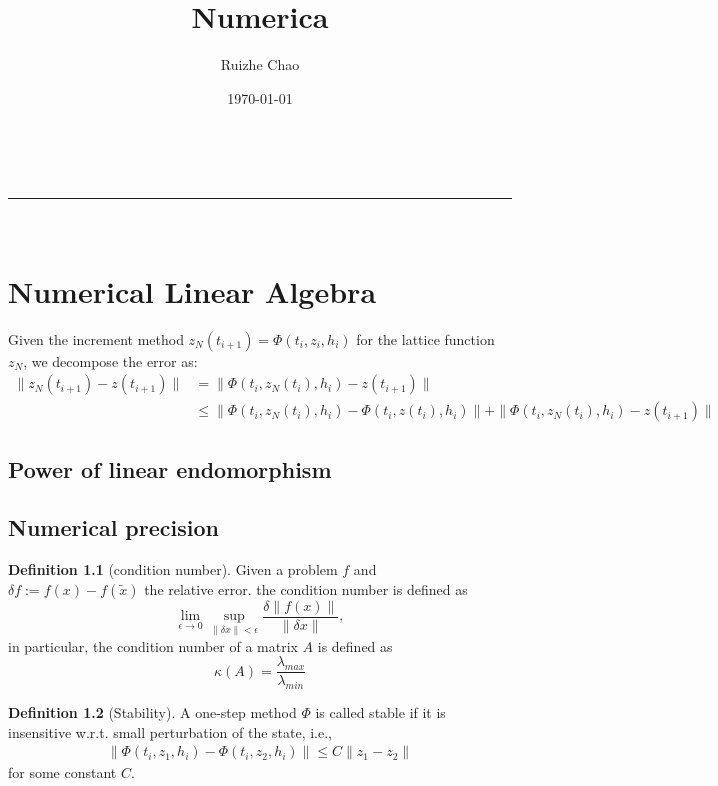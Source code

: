 \documentclass[a4paper,12pt,oneside,fleqn]{book}
\makeatletter
\theoremstyle{definition}
\newtheorem{definition}{Definition}[section]
\theoremstyle{remark}
\newcommand{\linia}{\rule{\linewidth}{0.5pt}}
\renewcommand{\maketitle}{
\begin{center}
\vspace{2ex}
{\huge \textsc{\@title}}
\vspace{1ex}
\\
\linia\\
\@author \hfill \@date
\vspace{4ex}
\end{center}
}
\makeatother
\begin{document}
\title{Numerica}
\author{Ruizhe Chao}
\date{\today}
\maketitle
\tableofcontents



\chapter{Numerical Linear Algebra}
Given the increment method $ z_N(t_{i + 1}) = \Phi(t_i, z_i, h_i)$  for the lattice function $z_N$, we decompose the error as:
\begin{align*}
	\|z_N(t_{i + 1}) - z(t_{i + 1})\| &= \|\Phi(t_i, z_N(t_i), h_i) - z(t_{i + 1})\|\\
	&\le \| \Phi(t_i, z_N(t_i), h_i) - \Phi(t_i, z(t_i), h_i)\|
	 + \|\Phi(t_i, z_N(t_i), h_i)  - z(t_{i + 1})\|
\end{align*}


\section{Power of linear endomorphism}


\section{Numerical precision}
\begin{definition}[condition number]
Given a problem $f$ and $\delta f:= f(x) - f(\tilde{x})$ the relative error. the condition number is defined as 
\begin{equation}
	\lim_{\epsilon \rightarrow 0} \sup_{\|\delta x\|< \epsilon} \frac{\delta\|f(x)\|}{\|\delta x\|},
\end{equation}
in particular, the condition number of a matrix $A$ is defined as
\begin{equation}
	\kappa(A) = \frac{\lambda_{max}}{\lambda_{min}}
\end{equation}
\end{definition}

\begin{definition}[Stability]
	A one-step method $\Phi$ is called stable if it is insensitive w.r.t. small perturbation of the state, i.e.,  
	\begin{align*}
		\| \Phi(t_i, z_1, h_i) - \Phi(t_i, z_2, h_i)\| \le C \|z_1 - z_2\|
	\end{align*}
	for some constant $C$. 
\end{definition}
\end{document}
